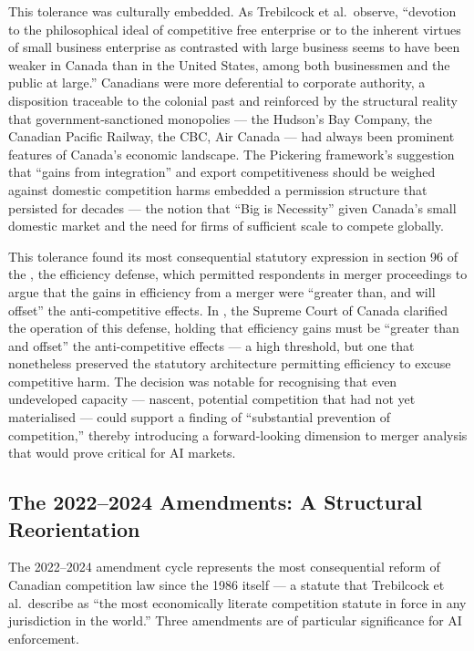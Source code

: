This tolerance was culturally embedded. As Trebilcock et al.\ observe, ``devotion to the philosophical ideal of competitive free enterprise or to the inherent virtues of small business enterprise as contrasted with large business seems to have been weaker in Canada than in the United States, among both businessmen and the public at large.'' Canadians were more deferential to corporate authority, a disposition traceable to the colonial past and reinforced by the structural reality that government-sanctioned monopolies --- the Hudson's Bay Company, the Canadian Pacific Railway, the CBC, Air Canada --- had always been prominent features of Canada's economic landscape. The Pickering framework's suggestion that ``gains from integration'' and export competitiveness should be weighed against domestic competition harms embedded a permission structure that persisted for decades --- the notion that ``Big is Necessity'' given Canada's small domestic market and the need for firms of sufficient scale to compete globally.

This tolerance found its most consequential statutory expression in section 96 of the , the efficiency defense, which permitted respondents in merger proceedings to argue that the gains in efficiency from a merger were ``greater than, and will offset'' the anti-competitive effects. In , the Supreme Court of Canada clarified the operation of this defense, holding that efficiency gains must be ``greater than and offset'' the anti-competitive effects --- a high threshold, but one that nonetheless preserved the statutory architecture permitting efficiency to excuse competitive harm. The  decision was notable for recognising that even undeveloped capacity --- nascent, potential competition that had not yet materialised --- could support a finding of ``substantial prevention of competition,'' thereby introducing a forward-looking dimension to merger analysis that would prove critical for AI markets.

\subsection{The 2022--2024 Amendments: A Structural Reorientation}

The 2022--2024 amendment cycle represents the most consequential reform of Canadian competition law since the 1986  itself --- a statute that Trebilcock et al.\ describe as ``the most economically literate competition statute in force in any jurisdiction in the world.'' Three amendments are of particular significance for AI enforcement.

